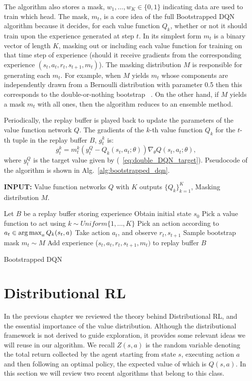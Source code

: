 The algorithm also stores a mask, $w_1, \ldots, w_K \in \{0, 1\}$ indicating data are used to train which head. The mask, $m_t$, is a core idea of the full Bootstrapped DQN algorithm because it decides, for each value function $Q_k$, whether or not it should train upon the experience generated at step $t$. In its simplest form $m_t$ is a binary vector of length $K$, masking out or including each value function for training on that time step of experience (\ie should it receive gradients from the corresponding experience $(s_t, a_t, r_t, s_{t+1},m_t)$). The masking distribution $M$ is responsible for generating each $m_t$. For example, when $M$ yields $m_t$ whose components are independently drawn from a Bernoulli distribution with parameter 0.5 then this corresponds to the double-or-nothing bootstrap ~\cite{owen2012}. On the other hand, if $M$ yields a mask $m_t$ with all ones, then the algorithm reduces to an ensemble method.\par
Periodically, the replay buffer is played back to update the parameters of the value function network $Q$. The gradients of the $k$-th value function $Q_k$ for the $t$-th tuple in the replay buffer $B$, $g_t^k$ is:
\begin{equation}
g_t^k=m_t^k(y_t^Q-Q_k(s_t,a_t;\theta))\nabla_{\theta}Q(s_t,a_t;\theta),
\end{equation}
where $y_t^Q$ is the target value given by (~\ref{eq:double_DQN_target}). Pseudocode of the algorithm is shown in Alg.~\ref{alg:bootstrapped_dqn}.
\begin{algorithm}[H]
	\textbf{INPUT:} Value function networks $Q$ with $K$ outputs $\lbrace Q_k \rbrace_{k=1}^{K}$, Masking distribution $M$.
 \begin{algorithmic} 
 \State Let $B$ be a replay buffer storing experience
 \State Obtain initial state $s_0$
 \State Pick a value function to act using $k \sim Uniform\lbrace1, \ldots, K\rbrace$
 	\State Pick an action according to $a_t \in \operatorname*{arg\,max}_a Q_k(s_t,a)$
 	\State Take action $a_t$, and observe $r_t,s_{t+1}$
 	\State Sample bootstrap mask $m_t \sim M$
 	\State Add experience ($s_t,a_t,r_t,s_{t+1},m_t)$ to replay buffer $B$
 \EndFor
 \EndFor
 \end{algorithmic}
	\caption{Bootstrapped DQN}
 \label{alg:bootstrapped_dqn}
\end{algorithm}

\section{Distributional RL} \label{distributional_rl}
In the previous chapter we reviewed the theory behind Distributional RL, and the essential importance of the value distribution. Although the distributional framework is not derived to guide exploration, it provides some relevant ideas we will reuse in our algorithm. We recall $Z(s,a)$ is the random variable denoting the total return collected by the agent starting from state $s$, executing action $a$ and then following an optimal policy, the expected value of which is $Q(s,a)$. In this section we will review two recent algorithms that belong to this class.
